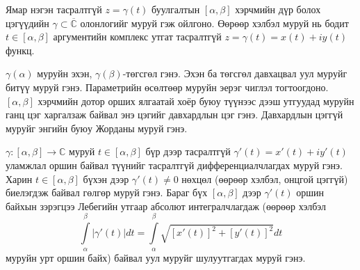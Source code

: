 Ямар нэгэн тасралтгүй $z=\gamma (t)$ буулгалтын $[\alpha, \beta]$ хэрчмийн дүр болох цэгүүдийн $\gamma\subset \overline{\mathbb{C}}$ олонлогийг муруй гэж ойлгоно. Өөрөөр хэлбэл муруй нь бодит $t\in [\alpha, \beta]$ аргументийн комплекс утгат тасралтгүй $z=\gamma (t)=x(t)+iy (t)$ функц.

$\gamma (\alpha)$ муруйн эхэн, $\gamma (\beta)$-төгсгөл гэнэ. Эхэн ба төгсгөл давхацвал уул муруйг битүү муруй гэнэ. Параметрийн өсөлтөөр муруйн эерэг чиглэл тогтоогдоно. $[\alpha,\beta]$ хэрчмийн дотор орших ялгаатай хоёр буюу түүнээс дээш утгуудад муруйн ганц цэг харгалзаж байвал энэ цэгийг давхардлын цэг  гэнэ. Давхардлын цэггүй муруйг энгийн буюу Жорданы муруй гэнэ.

$\gamma: [\alpha, \beta]\rightarrow \mathbb{C}$ муруй $t\in [\alpha,\beta]$ бүр дээр тасралтгүй $\gamma '(t)= x' (t)+iy '(t)$ уламжлал оршин байвал түүнийг тасралтгүй дифференциалчлагдах муруй гэнэ. Харин $t\in [\alpha,\beta]$ бүхэн дээр
$\gamma ' (t)\neq 0$ нөхцөл (өөрөөр хэлбэл, онцгой цэггүй) биелэгдэж байвал гөлгөр муруй  гэнэ. Бараг бүх $[\alpha, \beta]$ дээр $\gamma '(t)$ оршин байхын зэрэгцээ Лебегийн утгаар абсолют интегралчлагдаж  (өөрөөр хэлбэл 
$$\int\limits_{\alpha}^\beta |\gamma ' (t)|dt= \int\limits_\alpha ^\beta \sqrt{ [x'(t)]^2+[y'(t)]^2}dt$$
муруйн урт оршин байх) байвал уул муруйг шулуутгагдах муруй  гэнэ.

